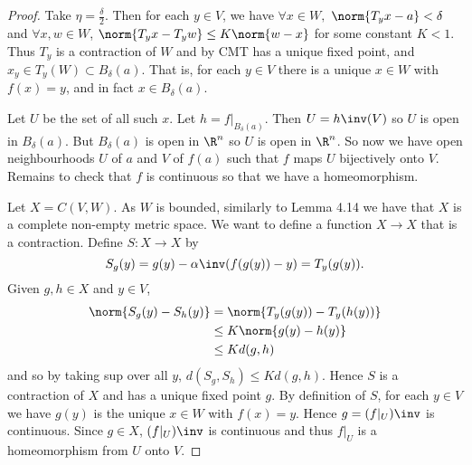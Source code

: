 \begin{proof}
Take $\eta = \frac{\delta}{2}$. Then for each $y\in V$, we have $\forall x\in W,$ $\norm{T_yx-a}<\delta$ and $\forall x,w\in W$, $\norm{T_yx - T_yw}\leq K\norm{w-x}$ for some constant $K<1$. Thus $T_y$ is a contraction of $W$ and by CMT has a unique fixed point, and $x_y\in T_y(W)\subset B_\delta(a)$. That is, for each $y\in V$ there is a unique $x\in W$ with $f(x) = y$, and in fact $x\in B_\delta(a)$.

Let $U$ be the set of all such $x$. Let $h=f|_{B_\delta(a)}$. Then $U=h\inv(V)$ so $U$ is open in $B_\delta(a)$. But $B_\delta(a)$ is open in $\R^n$ so $U$ is open in $\R^n$. So now we have open neighbourhoods $U$ of $a$ and $V$ of $f(a)$ such that $f$ maps $U$ bijectively onto $V$. Remains to check that $f$ is continuous so that we have a homeomorphism.

Let $X = C(V,W)$. As $W$ is bounded, similarly to Lemma 4.14 we have that $X$ is a complete non-empty metric space. We want to define a function $X\to X$ that is a contraction. Define $S:X\to X$ by \[S_g(y) = g(y) - \alpha\inv(f(g(y))-y) = T_y(g(y)). \]
Given $g,h\in X$ and $y\in V$,
\begin{align*}
    \norm{S_g(y) - S_h(y)} &= \norm{T_y(g(y)) - T_y(h(y))}\\
    &\leq K\norm{g(y) - h(y)}\\
    &\leq Kd(g,h)
\end{align*}
and so by taking sup over all $y$, $d(S_g,S_h) \leq Kd(g,h)$. Hence $S$ is a contraction of $X$ and has a unique fixed point $g$. By definition of $S$, for each $y\in V$ we have $g(y)$ is the unique $x\in W$ with $f(x) = y$. Hence $g = (f|_U)\inv$ is continuous. Since $g\in X$, $(f|_U)\inv$ is continuous and thus $f|_U$ is a homeomorphism from $U$ onto $V$.
\end{proof}